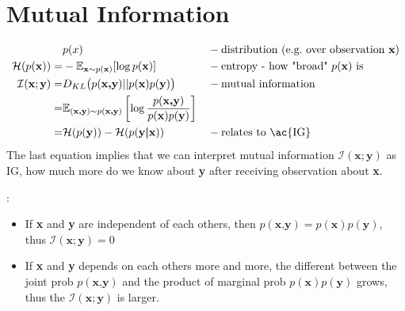 \section{Mutual Information}
\begin{align}
	&p(x) &&-\text{distribution (\eg over observation $\textbf{x}$)}\\
	\mathcal{H}(p(\textbf{x})) =& -\mathbb{E}_{\textbf{x}\sim p(\textbf{x})} [\log p(\textbf{x})] &&-\text{entropy - how "broad" $p(\textbf{x})$ is}\\
	\mathcal{I}(\textbf{x};\textbf{y}) =& D_{KL} \big(p(\textbf{x,y}) || p(\textbf{x}) p(\textbf{y})\big) &&-\text{mutual information}\\
	=& \mathbb{E}_{(\textbf{x,y}) \sim p(\textbf{x,y})} \left[ \log \frac{p(\textbf{x,y})}{p(\textbf{x})p(\textbf{y})} \right]\\
	=& \mathcal{H}(p(\textbf{y})) - \mathcal{H}(p(\textbf{y|x})) &&-\text{relates to \ac{IG}}
\end{align}
The last equation implies that we can interpret mutual information $\mathcal{I}(\textbf{x};\textbf{y})$ as \ac{IG}, how much more do we know about \textbf{y} after receiving observation about \textbf{x}.

\Eg:
\begin{itemize}
	\item If \textbf{x} and \textbf{y} are independent of each others, then $p(\textbf{x,y}) = p(\textbf{x}) p(\textbf{y})$, thus $\mathcal{I}(\textbf{x};\textbf{y})=0$
	\item If \textbf{x} and \textbf{y} depends on each others more and more, the different between the joint \ac{prob} $p(\textbf{x,y})$ and the product of marginal \ac{prob} $p(\textbf{x}) p(\textbf{y})$ grows, thus the $\mathcal{I}(\textbf{x};\textbf{y})$ is larger.
\end{itemize}